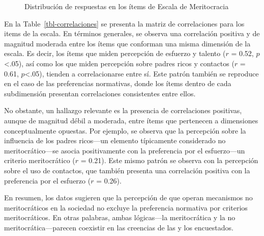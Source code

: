 \documentclass[
  12pt,
]{article}
\begin{document}
\begin{figure}

\caption{\label{fig-likert}Distribución de respuestas en los ítems de
Escala de Meritocracia}


\end{figure}%

En la Table~\ref{tbl-correlaciones} se presenta la matriz de
correlaciones para los items de la escala. En términos generales, se
observa una correlación positiva y de magnitud moderada entre los ítems
que conforman una misma dimensión de la escala. Es decir, los ítems que
miden percepción de esfuerzo y talento (\(r\) = 0.52,
\(p\)\textless.05), así como los que miden percepción sobre padres ricos
y contactos (\(r\) = 0.61, \(p\)\textless.05), tienden a correlacionarse
entre sí. Este patrón también se reproduce en el caso de las
preferencias normativas, donde los ítems dentro de cada subdimensión
presentan correlaciones consistentes entre ellos.

No obstante, un hallazgo relevante es la presencia de correlaciones
positivas, aunque de magnitud débil a moderada, entre ítems que
pertenecen a dimensiones conceptualmente opuestas. Por ejemplo, se
observa que la percepción sobre la influencia de los padres ricos---un
elemento típicamente considerado no meritocrático---se asocia
positivamente con la preferencia por el esfuerzo---un criterio
meritocrático (\(r\) = 0.21). Este mismo patrón se observa con la
percepción sobre el uso de contactos, que también presenta una
correlación positiva con la preferencia por el esfuerzo (\(r\) = 0.26).

En resumen, los datos sugieren que la percepción de que operan
mecanismos no meritocráticos en la sociedad no excluye la preferencia
normativa por criterios meritocráticos. En otras palabras, ambas
lógicas---la meritocrática y la no meritocrática---parecen coexistir en
las creencias de las y los encuestados.
\end{document}
